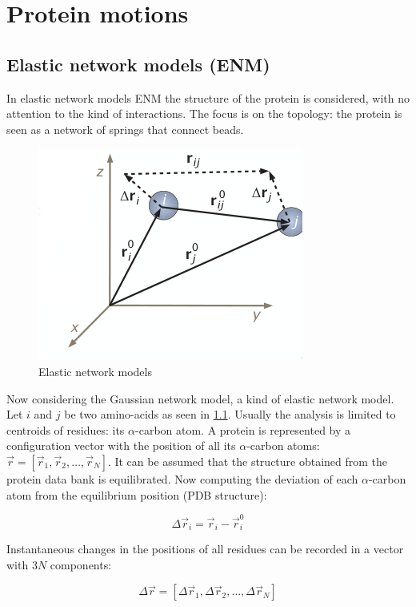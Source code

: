 \graphicspath{{chapters/15/images/}}
\chapter{Protein motions}

\section{Elastic network models (ENM)}
In elastic network models ENM the structure of the protein is considered, with no attention to the kind of interactions.
The focus is on the topology: the protein is seen as a network of springs that connect beads.

\begin{figure}[H]
	\centering
	\includegraphics[scale = 0.5]{enm-theory}
	\caption{Elastic network models}
	\label{fig:enm-theory}
\end{figure}

Now considering the Gaussian network model, a kind of elastic network model.
Let $i$ and $j$ be two amino-acids as seen in \ref{fig:enm-theory}.
Usually the analysis is limited to centroids of residues: its $\alpha$-carbon atom.
A protein is represented by a configuration vector with the position of all its $\alpha$-carbon atoms: $\vec{r} = [\vec{r}_1, \vec{r}_2, \dots, \vec{r}_N]$.
It can be assumed that the structure obtained from the protein data bank is equilibrated.
Now computing the deviation of each $\alpha$-carbon atom from the equilibrium position (PDB structure):

$$\Delta\vec{r}_i = \vec{r}_i-\vec{r}_i^0$$

Instantaneous changes in the positions of all residues can be recorded in a vector with $3N$ components:

$$\Delta\vec{r} = [\Delta\vec{r}_1, \Delta\vec{r}_2, \dots, \Delta\vec{r}_N]$$


